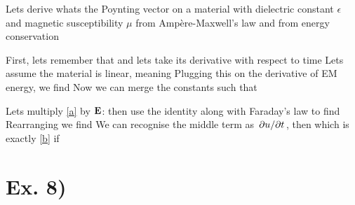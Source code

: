 \documentclass[oneside, 10pt, notitlepage]{book}
\begin{document}
Lets derive whats the Poynting vector on a material with dielectric constant \(\epsilon\) and magnetic susceptibility \(\mu\) from Ampère-Maxwell's law
and from energy conservation
\par 

First, lets remember that 
and lets take its derivative with respect to time
Lets assume the material is linear, meaning
Plugging this on the derivative of EM energy, we find
Now we can merge the constants such that

Lets multiply \eqref{a} by \(\vb{E}\):
then use the identity
along with Faraday's law
to find
Rearranging we find
We can recognise the middle term as \(\pdv*{u}{t}\), then
which is exactly \eqref{b} if
\par 

\section*{Ex. 8)}
\end{document}
